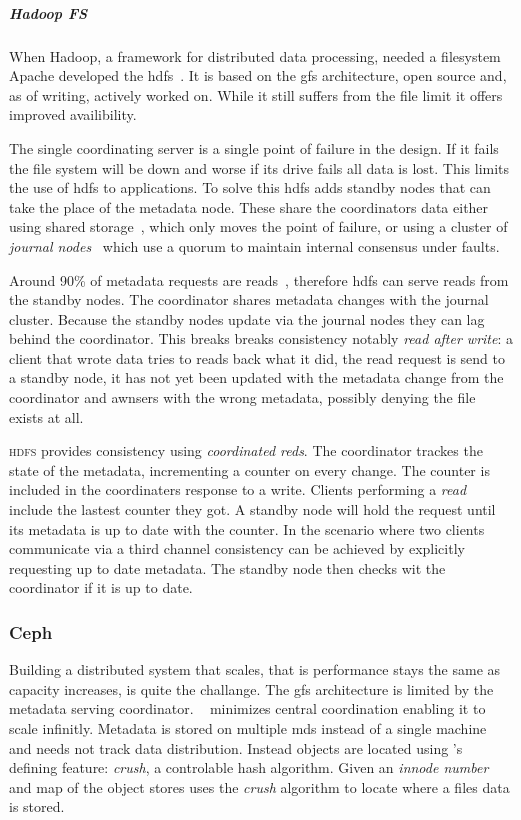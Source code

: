 \subparagraph*{Hadoop FS}
When Hadoop, a framework for distributed data processing, needed a filesystem Apache developed the \ac{hdfs}~\cite{hdfs}. It is based on the \ac{gfs} architecture, open source and, as of writing, actively worked on. While it still suffers from the file limit it offers improved availibility.

The single coordinating server is a single point of failure in the design. If it fails the file system will be down and worse if its drive fails all data is lost. This limits the use of \ac{hdfs} to applications. To solve this \ac{hdfs} adds standby nodes that can take the place of the metadata node. These share the coordinators data either using shared storage~\cite{hdfs_ha_nfs}, which only moves the point of failure, or using a cluster of \textit{journal nodes}~\cite{hdfs_ha_q} which use a quorum to maintain internal consensus under faults. 

Around 90\% of metadata requests are reads~\cite{hdfs_ha_reads}, therefore \ac{hdfs} can serve reads from the standby nodes. The coordinator shares metadata changes with the journal cluster. Because the standby nodes update via the journal nodes they can lag behind the coordinator. This breaks breaks consistency notably \textit{read after write}: a client that wrote data tries to reads back what it did, the read request is send to a standby node, it has not yet been updated with the metadata change from the coordinator and awnsers with the wrong metadata, possibly denying the file exists at all. 

\textsc{hdfs} provides consistency using \textit{coordinated reds}. The coordinator trackes the state of the metadata, incrementing a counter on every change. The counter is included in the coordinaters response to a write. Clients performing a \textit{read} include the lastest counter they got. A standby node will hold the request until its metadata is up to date with the counter. In the scenario where two clients communicate via a third channel consistency can be achieved by explicitly requesting up to date metadata. The standby node then checks wit the coordinator if it is up to date.

\subsubsection*{Ceph}
Building a distributed system that scales, that is performance stays the same as capacity increases, is quite the challange. The \ac{gfs} architecture is limited by the metadata serving coordinator. ~\cite{ceph} minimizes central coordination enabling it to scale infinitly. Metadata is stored on multiple \ac{mds} instead of a single machine and needs not track data distribution. Instead objects are located using 's defining feature: \emph{\ac{crush}}, a controlable hash algorithm. Given an \textit{innode number} and map of the object stores  uses the \emph{\ac{crush}} algorithm to locate where a files data is stored. 

